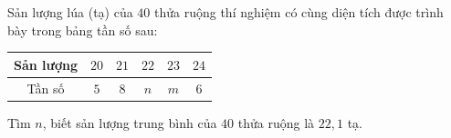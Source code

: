 \begin{ex}
Sản lượng lúa (tạ) của $40$ thửa ruộng thí nghiệm có cùng diện tích được trình bày trong bảng tần số sau:
\begin{center}
\begin{tabular}{|c|c|c|c|c|c|}\hline
Sản lượng & $20$ & $21$ & $22$ & $23$ & $24$\\\hline
Tần số & $5$ & $8$ & $n$ & $m$ & $6$\\\hline
\end{tabular}
\end{center}
Tìm $n$, biết sản lượng trung bình của $40$ thửa ruộng là $22{,}1$ tạ.
\end{ex}
